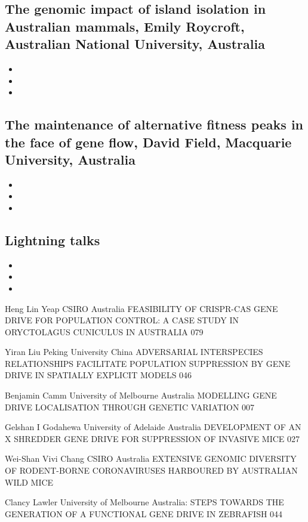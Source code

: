 \documentclass[document.tex]{subfiles}
\begin{document}
        \subsection{The genomic impact of island isolation in Australian mammals, Emily Roycroft, Australian National University, Australia}
            \begin{itemize}
                \item 
                \item 
                \item 
                \end{itemize} 

        \subsection{The maintenance of alternative fitness peaks in the face of gene flow, David Field, Macquarie University, Australia}
            \begin{itemize}
                \item 
                \item 
                \item 
                \end{itemize} 

        \subsection{Lightning talks}
            \begin{itemize}
                \item 
                \item 
                \item 
                \end{itemize} 



                Heng Lin Yeap CSIRO Australia FEASIBILITY OF CRISPR-CAS GENE DRIVE FOR POPULATION CONTROL: A CASE STUDY IN ORYCTOLAGUS CUNICULUS IN AUSTRALIA 079

                Yiran Liu Peking University China ADVERSARIAL INTERSPECIES RELATIONSHIPS FACILITATE POPULATION SUPPRESSION BY GENE DRIVE IN SPATIALLY EXPLICIT MODELS 046

                Benjamin Camm University of Melbourne Australia MODELLING GENE DRIVE LOCALISATION THROUGH GENETIC VARIATION 007

                Gelshan I Godahewa University of Adelaide Australia DEVELOPMENT OF AN X SHREDDER GENE DRIVE FOR SUPPRESSION OF INVASIVE MICE 027

                Wei-Shan Vivi Chang CSIRO Australia EXTENSIVE GENOMIC DIVERSITY OF RODENT-BORNE CORONAVIRUSES HARBOURED BY AUSTRALIAN WILD MICE

                Clancy Lawler University of Melbourne Australia: STEPS TOWARDS THE GENERATION OF A FUNCTIONAL GENE DRIVE IN ZEBRAFISH 044


   
    \bib{}
\end{document}
